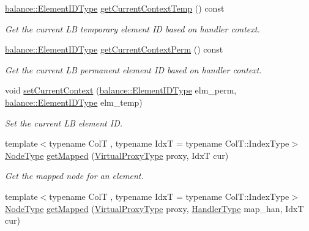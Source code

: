 \begin{DoxyCompactItemize}
\hyperlink{namespacevt_1_1vrt_1_1collection_1_1balance_a14c8d2c972f2913aa3f1636e5be0a120}{balance\+::\+Element\+I\+D\+Type} \hyperlink{structvt_1_1vrt_1_1collection_1_1_collection_manager_a3b98d63294b7f4faf8a64bcb91df69d4}{get\+Current\+Context\+Temp} () const
\begin{DoxyCompactList}\small\item\em Get the current LB temporary element ID based on handler context. \end{DoxyCompactList}\item 
\hyperlink{namespacevt_1_1vrt_1_1collection_1_1balance_a14c8d2c972f2913aa3f1636e5be0a120}{balance\+::\+Element\+I\+D\+Type} \hyperlink{structvt_1_1vrt_1_1collection_1_1_collection_manager_a9dc40e7ddd4cd8d4fa0fb5e10381f73f}{get\+Current\+Context\+Perm} () const
\begin{DoxyCompactList}\small\item\em Get the current LB permanent element ID based on handler context. \end{DoxyCompactList}\item 
void \hyperlink{structvt_1_1vrt_1_1collection_1_1_collection_manager_a4f278f2bc3e5304307098f6f7420b964}{set\+Current\+Context} (\hyperlink{namespacevt_1_1vrt_1_1collection_1_1balance_a14c8d2c972f2913aa3f1636e5be0a120}{balance\+::\+Element\+I\+D\+Type} elm\+\_\+perm, \hyperlink{namespacevt_1_1vrt_1_1collection_1_1balance_a14c8d2c972f2913aa3f1636e5be0a120}{balance\+::\+Element\+I\+D\+Type} elm\+\_\+temp)
\begin{DoxyCompactList}\small\item\em Set the current LB element ID. \end{DoxyCompactList}\item 
{\footnotesize template$<$typename ColT , typename IdxT  = typename Col\+T\+::\+Index\+Type$>$ }\\\hyperlink{namespacevt_a866da9d0efc19c0a1ce79e9e492f47e2}{Node\+Type} \hyperlink{structvt_1_1vrt_1_1collection_1_1_collection_manager_a7db90d5e08077593edbff643b579c2cb}{get\+Mapped} (\hyperlink{namespacevt_a1b417dd5d684f045bb58a0ede70045ac}{Virtual\+Proxy\+Type} proxy, IdxT cur)
\begin{DoxyCompactList}\small\item\em Get the mapped node for an element. \end{DoxyCompactList}\item 
{\footnotesize template$<$typename ColT , typename IdxT  = typename Col\+T\+::\+Index\+Type$>$ }\\\hyperlink{namespacevt_a866da9d0efc19c0a1ce79e9e492f47e2}{Node\+Type} \hyperlink{structvt_1_1vrt_1_1collection_1_1_collection_manager_a9085fd0dc95af7d4a887e250e7623fd6}{get\+Mapped} (\hyperlink{namespacevt_a1b417dd5d684f045bb58a0ede70045ac}{Virtual\+Proxy\+Type} proxy, \hyperlink{namespacevt_af64846b57dfcaf104da3ef6967917573}{Handler\+Type} map\+\_\+han, IdxT cur)

\end{DoxyCompactItemize}
